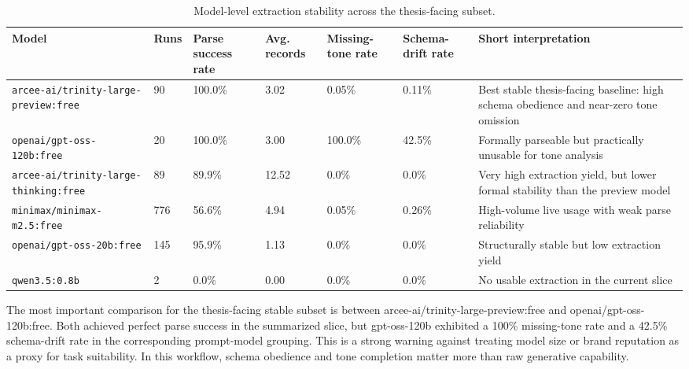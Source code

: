 \begin{landscape}
\begin{table}[p]
\centering
\caption{Model-level extraction stability across the thesis-facing subset.}
\label{tab:model-level-extraction-stability}
\small
\renewcommand{\arraystretch}{1.2}
\begin{tabularx}{\linewidth}{|X|p{1.8cm}|p{1.8cm}|p{1.8cm}|p{1.8cm}|p{1.8cm}|X|}
\hline
\textbf{Model} & \textbf{Runs} & \textbf{Parse success rate} & \textbf{Avg. records} & \textbf{Missing-tone rate} & \textbf{Schema-drift rate} & \textbf{Short interpretation} \\ \hline

\texttt{arcee-ai/trinity-large-preview:free} & 90 & 100.0\% & 3.02 & 0.05\% & 0.11\%  & Best stable thesis-facing baseline: high schema obedience and near-zero tone omission \\ \hline
\texttt{openai/gpt-oss-120b:free} & 20 & 100.0\% & 3.00 & 100.0\% & 42.5\%  & Formally parseable but practically unusable for tone analysis \\ \hline
\texttt{arcee-ai/trinity-large-thinking:free} & 89 & 89.9\% & 12.52 & 0.0\% & 0.0\%  & Very high extraction yield, but lower formal stability than the preview model \\ \hline
\texttt{minimax/minimax-m2.5:free} & 776 & 56.6\% & 4.94 & 0.05\% & 0.26\%  & High-volume live usage with weak parse reliability \\ \hline
\texttt{openai/gpt-oss-20b:free} & 145 & 95.9\% & 1.13 & 0.0\% & 0.0\%  & Structurally stable but low extraction yield \\ \hline
\texttt{qwen3.5:0.8b} & 2 & 0.0\% & 0.00 & 0.0\% & 0.0\%  & No usable extraction in the current slice \\ \hline
\end{tabularx}
\end{table}
\end{landscape}




The most important comparison for the thesis-facing stable subset is between arcee-ai/trinity-large-preview:free and openai/gpt-oss-120b:free. Both achieved perfect parse success in the summarized slice, but gpt-oss-120b exhibited a 100\% missing-tone rate and a 42.5\% schema-drift rate in the corresponding prompt-model grouping. This is a strong warning against treating model size or brand reputation as a proxy for task suitability. In this workflow, schema obedience and tone completion matter more than raw generative capability.

